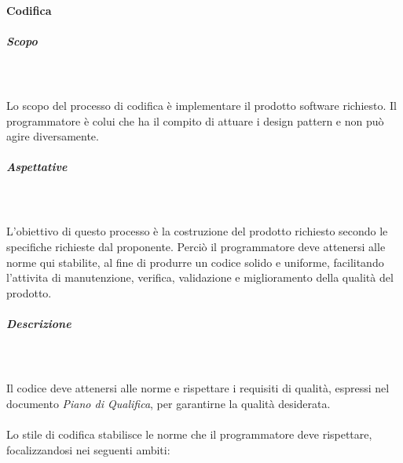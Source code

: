 	\paragraph{Codifica}
		\subparagraph*{Scopo}\mbox{} \\ \mbox{} \\
		Lo scopo del processo di codifica è implementare il prodotto software richiesto. Il programmatore è colui che ha il compito di attuare i design pattern e non può agire diversamente.
		\subparagraph*{Aspettative}\mbox{} \\ \mbox{} \\
		L'obiettivo di questo processo è la costruzione del prodotto richiesto secondo le specifiche richieste dal proponente. Perciò il programmatore deve attenersi alle norme qui stabilite, al fine di produrre un codice solido e uniforme, facilitando l'attivita di manutenzione, verifica, validazione e miglioramento della qualità del prodotto.
		\subparagraph*{Descrizione}\mbox{} \\ \mbox{} \\
		Il codice deve attenersi alle norme e rispettare i requisiti di qualità, espressi nel documento \textit{Piano di Qualifica}, per garantirne la qualità desiderata.
		 \mbox{} \\ \mbox{} \\
		Lo stile di codifica stabilisce le norme che il programmatore deve rispettare, focalizzandosi nei seguenti ambiti:
